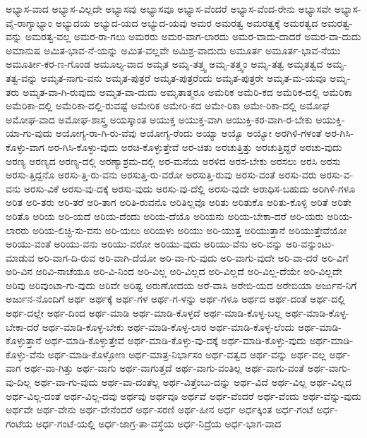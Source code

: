 {ಅಭ್ಯಾಸ-ವಾದ
ಅಭ್ಯಾಸ-ವಿಲ್ಲದೇ
ಅಭ್ಯಾಸವು
ಅಭ್ಯಾಸವೂ
ಅಭ್ಯಾಸ-ವೆಂದರೆ
ಅಭ್ಯಾಸ-ವೆಂದ-ರೇನು
ಅಭ್ಯಾಸವೇ
ಅಭ್ಯಾಸ-ವೈ-ರಾಗ್ಯಾಭ್ಯಾಂ
ಅಭ್ಯುದಯ
ಅಭ್ಯುದ-ಯದ
ಅಭ್ಯುದ-ಯವು
ಅಮರ
ಅಮರತ್ವ
ಅಮರತ್ವಕ್ಕೆ
ಅಮರತ್ವದ
ಅಮರತ್ವ-ವನ್ನು
ಅಮರತ್ವ-ವಲ್ಲ
ಅಮರ-ರಾ-ಗಲು
ಅಮರರು
ಅಮರ-ವಾಗ-ಲಾರದು
ಅಮರ-ವಾದು-ದಾದರೆ
ಅಮರ-ವಾ-ದುದು
ಅಮಾನುಷ
ಅಮಿತ-ಭಾವ-ನೆ-ಯನ್ನು
ಅಮಿತ-ವಲ್ಲವೇ
ಅಮಿಶ್ರ-ವಾದುದು
ಅಮೂರ್ತ
ಅಮೂರ್ತ-ಭಾವ-ನೆಯು
ಅಮೂರ್ತೀ-ಕರ-ಣ-ಗೊಂಡ
ಅಮೂಲ್ಯ-ವಾದ
ಅಮೃತ
ಅಮೃ-ತತ್ತ್ವ
ಅಮೃ-ತತ್ತ್ವಂ
ಅಮೃ-ತತ್ವ
ಅಮೃತತ್ವದ
ಅಮೃ-ತತ್ವ-ವನ್ನು
ಅಮೃತ-ನಾಗು-ವನು
ಅಮೃತ-ಪುತ್ರರೆ
ಅಮೃತ-ಪುತ್ರರೆಂದು
ಅಮೃತ-ಪುತ್ರರೇ
ಅಮೃತ-ಮ-ಯವೂ
ಅಮೃ-ತರು
ಅಮೃತ-ವಾ-ಗಿ-ರುವುದು
ಅಮೃತ-ವಾ-ದುದು
ಅಮೃತಾತ್ಮರೂ
ಅಮೆರಿಕ
ಅಮೆರಿ-ಕದ
ಅಮೆರಿಕ-ದಲ್ಲಿ
ಅಮೆರಿಕಾ
ಅಮೆರಿಕಾ-ದಲ್ಲಿ
ಅಮೆರಿಕಾ-ದಲ್ಲಿ-ರುವಷ್ಟೆ
ಅಮೇರಿಕ
ಅಮೇರಿ-ಕದ
ಅಮೇ-ರಿಕಾ
ಅಮೇ-ರಿಕಾ-ದಲ್ಲಿ
ಅಮೋಘ
ಅಮೋಘ-ವಾದ
ಅಮೋಘ-ಶಾಸ್ತ್ರ
ಅಯಸ್ಕಾಂತ
ಅಯುಕ್ತ
ಅಯುಕ್ತ-ವಾಗಿ
ಅಯುಕ್ತಿ-ಕರ-ವಾಗಿ-ರ-ಬೇಕು
ಅಯುಕ್ತಿ-ಯಾ-ಗು-ವುದು
ಅಯೋಗ್ಯ-ರಾ-ಗಿ-ರು-ವೆವು
ಅಯೋಗ್ಯ-ರೆಂದು
ಅಯ್ಯಾ
ಅಯ್ಯೊ
ಅಯ್ಯೋ
ಅರಗಿಳಿ-ಗಳಂತೆ
ಅರ-ಗಿಸಿ-ಕೊಳ್ಳು-ವಾಗ
ಅರ-ಗಿಸಿ-ಕೊಳ್ಳು-ವುದು
ಅರಚಿ-ಕೊಳ್ಳುತ್ತೇವೆ
ಅರ-ಚಿತು
ಅರಚುತ್ತಿತ್ತು
ಅರಚುತ್ತಿದ್ದರೆ
ಅರಚು-ವುದು
ಅರಣ್ಯ
ಅರಣ್ಯದ
ಅರಣ್ಯ-ದಲ್ಲಿ
ಅರಣ್ಯಾಶ್ರಮ-ದಲ್ಲಿ
ಅರ-ಮನೆಯ
ಅರಳಿದ
ಅರಸ-ಬೇಕು
ಅರಸಲು
ಅರಸಿ
ಅರಸು
ಅರಸು-ತ್ತಿದ್ದನೊ
ಅರಸು-ತ್ತಿ-ರು-ವನು
ಅರಸುತ್ತಿ-ರು-ವರೋ
ಅರಸುತ್ತಿ-ರುವು
ಅರಸು-ವಂತೆ
ಅರಸು-ವರು
ಅರಸು-ವ-ವನು
ಅರಸು-ವಿಕೆ
ಅರಸು-ವು-ದಕ್ಕೆ
ಅರಸು-ವುದು
ಅರಸು-ವು-ದೆಲ್ಲಿ
ಅರಸು-ವುದೇ
ಅರಾಧಿಸ-ಬಹುದು
ಅರಿಗಿಳಿ-ಗಳೂ
ಅರಿತ
ಅರಿ-ತರು
ಅರಿ-ತರೆ
ಅರಿ-ತಾಗ
ಅರಿತಿ-ರುವನೊ
ಅರಿತಿಲ್ಲವೊ
ಅರಿತು
ಅರಿತುಕೊ
ಅರಿತು-ಕೊಳ್ಳಿ
ಅರಿತೆ
ಅರಿತೇ
ಅರಿತೊ
ಅರಿಯ
ಅರಿ-ಯದೆ
ಅರಿಯ-ದೆಂದು
ಅರಿಯ-ದೆಯೊ
ಅರಿಯನು
ಅರಿಯ-ಬೇಕಾ-ದರೆ
ಅರಿ-ಯರು
ಅರಿಯ-ಲಾರರು
ಅರಿಯ-ಲಿಚ್ಛಿ-ಸು-ವನು
ಅರಿ-ಯಲು
ಅರಿಯಳು
ಅರಿಯು
ಅರಿ-ಯುತ್ತ
ಅರಿಯುತ್ತಾನೆ
ಅರಿಯುತ್ತೇವೆಯೋ
ಅರಿಯು-ವಂತೆ
ಅರಿಯು-ವನು
ಅರಿಯು-ವರೋ
ಅರಿಯು-ವುದು
ಅರಿಯು-ವೆನು
ಅರಿ-ವನ್ನು
ಅರಿ-ವನ್ನುಂಟು-ಮಾಡುವ
ಅರಿ-ವಾಗ-ದಿ-ರುವ
ಅರಿ-ವಾಗಿ-ದೆಯೋ
ಅರಿ-ವಾ-ಗು-ವುದು
ಅರಿ-ವಾಗು-ವುದೇ
ಅರಿ-ವಾ-ದರೆ
ಅರಿ-ವಿಗೆ
ಅರಿ-ವಿನ
ಅರಿವಿ-ನಾಚೆಯೂ
ಅರಿ-ವಿ-ನಿಂದ
ಅರಿ-ವಿಲ್ಲ
ಅರಿ-ವಿಲ್ಲದ
ಅರಿ-ವಿಲ್ಲದೆ
ಅರಿ-ವಿಲ್ಲ-ದೆಯೇ
ಅರಿ-ವಿಲ್ಲದೇ
ಅರಿವು
ಅರಿವುಂಟಾ-ಗು-ವುದು
ಅರಿವೇ
ಅರಿಷ್ಟ
ಅರುಣೋದಯ
ಅರೆ-ವಾಸಿ
ಅರೇಬಿ-ಯದ
ಅರೇಬಿಯಾ
ಅರ್ಜುನ-ನಿಗೆ
ಅರ್ಜುನ-ನೊಂದಿಗೆ
ಅರ್ಥ
ಅರ್ಥಕ್ಕೆ
ಅರ್ಥ-ಗಳ
ಅರ್ಥ-ಗ-ಳನ್ನು
ಅರ್ಥ-ಗಳೂ
ಅರ್ಥದ
ಅರ್ಥ-ದಂತೆ
ಅರ್ಥ-ದಲ್ಲಿ
ಅರ್ಥ-ದಲ್ಲೇ
ಅರ್ಥ-ದಿಂದ
ಅರ್ಥ-ಮಾಡಿ
ಅರ್ಥ-ಮಾಡಿ-ಕೊಳ್ಳದೆ
ಅರ್ಥ-ಮಾಡಿ-ಕೊಳ್ಳ-ಬಲ್ಲ
ಅರ್ಥ-ಮಾಡಿ-ಕೊಳ್ಳ-ಬೇಕಾ-ದರೆ
ಅರ್ಥ-ಮಾಡಿ-ಕೊಳ್ಳ-ಬೇಕು
ಅರ್ಥ-ಮಾಡಿ-ಕೊಳ್ಳ-ಲಾರ
ಅರ್ಥ-ಮಾಡಿ-ಕೊಳ್ಳ-ಲೆಂದು
ಅರ್ಥ-ಮಾಡಿ-ಕೊಳ್ಳುತ್ತಾನೆ
ಅರ್ಥ-ಮಾಡಿ-ಕೊಳ್ಳುತ್ತೇವೆ
ಅರ್ಥ-ಮಾಡಿ-ಕೊಳ್ಳು-ವು-ದಕ್ಕೆ
ಅರ್ಥ-ಮಾಡಿ-ಕೊಳ್ಳು-ವುದು
ಅರ್ಥ-ಮಾಡಿ-ಕೊಳ್ಳು-ವೆನು
ಅರ್ಥ-ಮಾಡಿ-ಕೊಳ್ಳೋಣ
ಅರ್ಥ-ಮಾತ್ರ-ನಿರ್ಭಾಸಂ
ಅರ್ಥ-ವತ್ವದ
ಅರ್ಥ-ವನ್ನು
ಅರ್ಥ-ವಲ್ಲ
ಅರ್ಥ-ವಾಗ
ಅರ್ಥ-ವಾ-ಗಿತ್ತು
ಅರ್ಥ-ವಾಗು
ಅರ್ಥ-ವಾಗುತ್ತದೆ
ಅರ್ಥ-ವಾಗು-ವಂತಿಲ್ಲ
ಅರ್ಥ-ವಾಗು-ವಂತೆ
ಅರ್ಥ-ವಾಗು-ವು-ದಿಲ್ಲ
ಅರ್ಥ-ವಾ-ಗು-ವುದು
ಅರ್ಥ-ವಾ-ದಂತೆಲ್ಲ
ಅರ್ಥ-ವಿತ್ತೆಂಬು-ದನ್ನು
ಅರ್ಥ-ವಿದೆ
ಅರ್ಥ-ವಿಲ್ಲ
ಅರ್ಥ-ವಿಲ್ಲದ
ಅರ್ಥ-ವಿಲ್ಲ-ದಂತೆ
ಅರ್ಥ-ವಿಲ್ಲ-ದವು
ಅರ್ಥವು
ಅರ್ಥವೂ
ಅರ್ಥವೆ
ಅರ್ಥ-ವೆಂದರೆ
ಅರ್ಥ-ವೆಂದು
ಅರ್ಥ-ವೆನ್ನು-ವುದು
ಅರ್ಥವೇ
ಅರ್ಥ-ವೇನು
ಅರ್ಥ-ವೇನೆಂದರೆ
ಅರ್ಥ-ಸರಣಿ
ಅರ್ಥ-ಹೀನ
ಅರ್ಧ
ಅರ್ಧಕ್ಕಿಂತ
ಅರ್ಧ-ಗಂಟೆ
ಅರ್ಧ-ಗಂಟೆಯ
ಅರ್ಧ-ಗಂಟೆ-ಯಲ್ಲಿ
ಅರ್ಧ-ಜಾಗ್ರ-ತಾ-ವಸ್ಥೆಯ
ಅರ್ಧ-ನಿದ್ರೆಯ
ಅರ್ಧ-ಭಾಗ-ವಾದ
}
